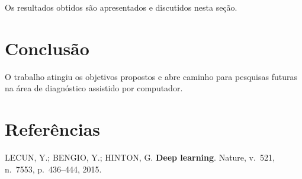 \documentclass{abnt-trabalho-academico}
\begin{document}
Os resultados obtidos são apresentados e discutidos nesta seção.

\chapter{Conclusão}

O trabalho atingiu os objetivos propostos e abre caminho para pesquisas
futuras na área de diagnóstico assistido por computador.

\postextual

\chapter*{Referências}

LECUN, Y.; BENGIO, Y.; HINTON, G. \textbf{Deep learning}. Nature,
v.~521, n.~7553, p.~436--444, 2015.
\end{document}
